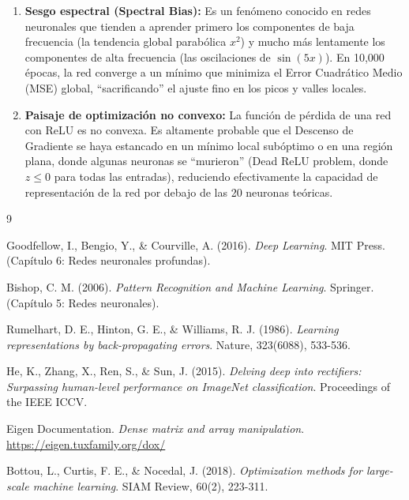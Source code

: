 \documentclass[12pt,a4paper]{article}
\theoremstyle{definition}
\begin{document}
\begin{enumerate}
\begin{enumerate}
    \item \textbf{Sesgo espectral (Spectral Bias):} Es un fenómeno conocido en redes neuronales que tienden a aprender primero los componentes de baja frecuencia (la tendencia global parabólica $x^2$) y mucho más lentamente los componentes de alta frecuencia (las oscilaciones de $\sin(5x)$). En 10,000 épocas, la red converge a un mínimo que minimiza el Error Cuadrático Medio (MSE) global, ``sacrificando'' el ajuste fino en los picos y valles locales.
    
    \item \textbf{Paisaje de optimización no convexo:} La función de pérdida de una red con ReLU es no convexa. Es altamente probable que el Descenso de Gradiente se haya estancado en un mínimo local subóptimo o en una región plana, donde algunas neuronas se ``murieron'' (Dead ReLU problem, donde $z \leq 0$ para todas las entradas), reduciendo efectivamente la capacidad de representación de la red por debajo de las 20 neuronas teóricas.
\end{enumerate}
\end{enumerate}
    

\begin{thebibliography}{9}

 Goodfellow, I., Bengio, Y., \& Courville, A. (2016). \textit{Deep Learning}. MIT Press. (Cap\'{i}tulo 6: Redes neuronales profundas).

 Bishop, C. M. (2006). \textit{Pattern Recognition and Machine Learning}. Springer. (Cap\'{i}tulo 5: Redes neuronales).

 Rumelhart, D. E., Hinton, G. E., \& Williams, R. J. (1986). \textit{Learning representations by back-propagating errors}. Nature, 323(6088), 533-536.

 He, K., Zhang, X., Ren, S., \& Sun, J. (2015). \textit{Delving deep into rectifiers: Surpassing human-level performance on ImageNet classification}. Proceedings of the IEEE ICCV.

 Eigen Documentation. \textit{Dense matrix and array manipulation}. \url{https://eigen.tuxfamily.org/dox/}

 Bottou, L., Curtis, F. E., \& Nocedal, J. (2018). \textit{Optimization methods for large-scale machine learning}. SIAM Review, 60(2), 223-311.

\end{thebibliography}
\end{document}
